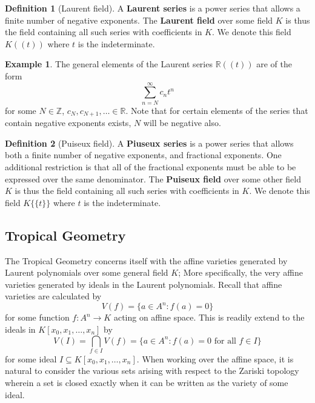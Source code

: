 \documentclass[12pt,a4paper]{amsart}
\newcommand{\Z}{\mathbb{Z}}
\newcommand{\R}{\mathbb{R}}
\newcommand{\K}{K}
\theoremstyle{definition}
\newtheorem{defn}{Definition}[section]
\newtheorem{ex}{Example}[section]
\theoremstyle{remark}
\begin{document}
\begin{defn}[Laurent field]
A \textbf{Laurent series} is a power series that allows a finite number of negative exponents.
The \textbf{Laurent field} over some field $\K$ is thus the field containing all such series with coefficients in $\K$. We denote this field $\K((t))$ where $t$ is the indeterminate.
\end{defn}

\begin{ex}
The general elements of the Laurent series $\R((t))$ are of the form
\begin{equation*}
    \sum_{n=N}^\infty c_n t^n
\end{equation*}
for some $N\in\Z$, $c_N,c_{N+1},\dots\in\R$. Note that for certain elements of the series that contain negative exponents exists, $N$ will be negative also.
\end{ex}

\begin{defn}[Puiseux field]
A \textbf{Piuseux series} is a power series that allows both a finite number of negative exponents, and fractional exponents. One additional restriction is that all of the fractional exponents must be able to be expressed over the same denominator.
The \textbf{Puiseux field} over some other field $\K$ is thus the field containing all such series with coefficients in $\K$. We denote this field $\K\{\{t\}\}$ where $t$ is the indeterminate.
\end{defn}

\subsection{Tropical Geometry}

The Tropical Geometry concerns itself with the affine varieties generated by Laurent polynomials over some general field $K$; More specifically, the very affine varieties generated by ideals in the Laurent polynomials. Recall that affine varieties are calculated by
\begin{equation}
    V(f)=\{ a\in A^n : f(a)=0 \}
\end{equation}
for some function $f:A^n\to K$ acting on affine space. This is readily extend to the ideals in $K[x_0,x_1,\dots,x_n]$ by
\begin{equation}
    V(I) = \bigcap_{f\in I} V(f) = \{ a\in A^n : f(a) = 0\text{ for all } f\in I \}
\end{equation}
for some ideal $I\subseteq K[x_0,x_1,\dots,x_n]$. When working over the affine space, it is natural to consider the various sets arising with respect to the Zariski topology wherein a set is closed exactly when it can be written as the variety of some ideal.
\end{document}
